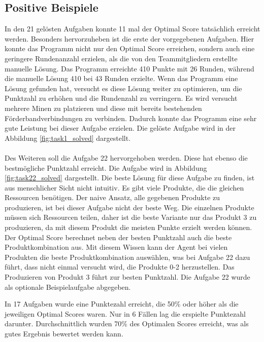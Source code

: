\subsection*{Positive Beispiele}
In den 21 gelösten Aufgaben konnte 11 mal der Optimal Score tatsächlich erreicht werden. Besonders hervorzuheben ist die erste der vorgegebenen Aufgaben.  Hier konnte das Programm nicht nur den Optimal Score erreichen, sondern auch eine geringere Rundenanzahl erzielen, als die von den Teammitgliedern erstellte manuelle Lösung. Das Programm erreichte 410 Punkte mit 26 Runden, während die manuelle Lösung 410 bei 43 Runden erzielte. Wenn das Programm eine Lösung gefunden hat, versucht es diese Lösung weiter zu optimieren, um die Punktzahl zu erhöhen und die Rundenzahl zu verringern. Es wird versucht mehrere Minen zu platzieren und diese mit bereits bestehenden Förderbandverbindungen zu verbinden. Dadurch konnte das Programm eine sehr gute Leistung bei dieser Aufgabe erzielen.
Die gelöste Aufgabe wird in der Abbildung \ref{fig:task1_solved} dargestellt.
\\\\
Des Weiteren soll die Aufgabe 22 hervorgehoben werden.  Diese hat ebenso die bestmögliche Punktzahl erreicht. Die Aufgabe wird in Abbildung \ref{fig:task22_solved} dargestellt. Die beste Lösung für diese Aufgabe zu finden, ist aus menschlicher Sicht nicht intuitiv. Es gibt viele Produkte, die die gleichen Ressourcen benötigen. Der naive Ansatz, alle gegebenen Produkte zu produzieren, ist bei dieser Aufgabe nicht der beste Weg. Die einzelnen Produkte müssen sich Ressourcen teilen, daher ist die beste Variante nur das Produkt 3 zu produzieren, da mit diesem Produkt die meisten Punkte erzielt werden können. Der Optimal Score berechnet neben der besten Punktzahl auch die beste Produktkombination aus. Mit diesem Wissen kann der Agent bei vielen Produkten die beste Produktkombination auswählen, was bei Aufgabe 22 dazu führt, dass nicht einmal versucht wird, die Produkte 0-2 herzustellen. Das Produzieren von Produkt 3 führt zur besten Punktzahl. Die Aufgabe 22 wurde als optionale Beispielaufgabe abgegeben.

\newpage
In 17 Aufgaben wurde eine Punktezahl erreicht, die 50\% oder höher als die jeweiligen Optimal Scores waren. Nur in 6 Fällen lag die erspielte Punktezahl darunter. Durchschnittlich wurden 70\% des Optimalen Scores erreicht, was als gutes Ergebnis bewertet werden kann.


